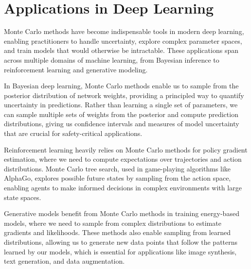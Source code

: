 
\section{Applications in Deep Learning }
\label{sec:mc-applications}

Monte Carlo methods have become indispensable tools in modern deep learning, enabling practitioners to handle uncertainty, explore complex parameter spaces, and train models that would otherwise be intractable. These applications span across multiple domains of machine learning, from Bayesian inference to reinforcement learning and generative modeling.

In Bayesian deep learning, Monte Carlo methods enable us to sample from the posterior distribution of network weights, providing a principled way to quantify uncertainty in predictions. Rather than learning a single set of parameters, we can sample multiple sets of weights from the posterior and compute prediction distributions, giving us confidence intervals and measures of model uncertainty that are crucial for safety-critical applications.

Reinforcement learning heavily relies on Monte Carlo methods for policy gradient estimation, where we need to compute expectations over trajectories and action distributions. Monte Carlo tree search, used in game-playing algorithms like AlphaGo, explores possible future states by sampling from the action space, enabling agents to make informed decisions in complex environments with large state spaces.

Generative models benefit from Monte Carlo methods in training energy-based models, where we need to sample from complex distributions to estimate gradients and likelihoods. These methods also enable sampling from learned distributions, allowing us to generate new data points that follow the patterns learned by our models, which is essential for applications like image synthesis, text generation, and data augmentation.




